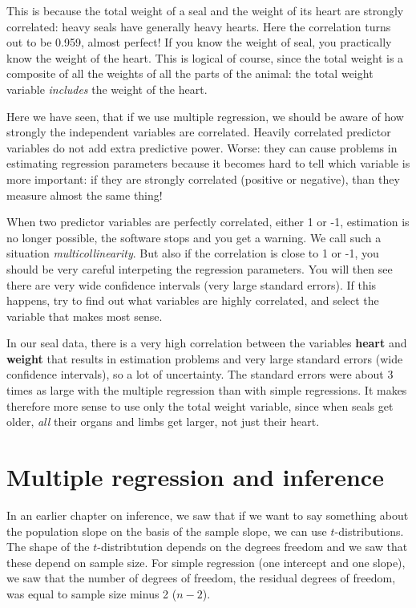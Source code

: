 \documentclass[]{book}\usepackage[]{graphicx}\usepackage[]{color}
\begin{document}
This is because the total weight of a seal and the weight of its heart are strongly correlated: heavy seals have generally heavy hearts. Here the correlation turns out to be 0.959, almost perfect! If you know the weight of seal, you practically know the weight of the heart. This is logical of course, since the total weight is a composite of all the weights of all the parts of the animal: the total weight variable \textit{includes} the weight of the heart.

Here we have seen, that if we use multiple regression, we should be aware of how strongly the independent variables are correlated. Heavily correlated predictor variables do not add extra predictive power. Worse: they can cause problems in estimating regression parameters because it becomes hard to tell which variable is more important: if they are strongly correlated (positive or negative), than they measure almost the same thing!

When two predictor variables are perfectly correlated, either 1 or -1, estimation is no longer possible, the software stops and you get a warning. We call such a situation \textit{multicollinearity}. But also if the correlation is close to 1 or -1, you should be very careful interpeting the regression parameters. You will then see there are very wide confidence intervals (very large standard errors). If this happens, try to find out what variables are highly correlated, and select the variable that makes most sense.

In our seal data, there is a very high correlation between the variables \textbf{heart} and \textbf{weight} that results in estimation problems and very large standard errors (wide confidence intervals), so a lot of uncertainty. The standard errors were about 3 times as large with the multiple regression than with simple regressions. It makes therefore more sense to use only the total weight variable, since when seals get older, \textit{all} their organs and limbs get larger, not just their heart.



\section{Multiple regression and inference}

In an earlier chapter on inference, we saw that if we want to say something about the population slope on the basis of the sample slope, we can use $t$-distributions. The shape of the $t$-distribtution depends on the degrees freedom and we saw that these depend on sample size. For simple regression (one intercept and one slope), we saw that the number of degrees of freedom, the residual degrees of freedom, was equal to sample size minus 2 ($n-2$).
\end{document}
